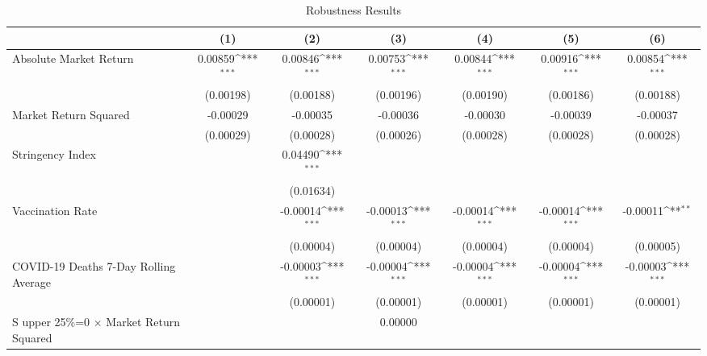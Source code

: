 \begin{table}[htbp]\centering
\def\sym#1{\ifmmode^{#1}\else\(^{#1}\)\fi}
\caption{Robustness Results \label{reg2}}
\begin{tabular}{l*{6}{c}}
\toprule
                    &\multicolumn{1}{c}{(1)}         &\multicolumn{1}{c}{(2)}         &\multicolumn{1}{c}{(3)}         &\multicolumn{1}{c}{(4)}         &\multicolumn{1}{c}{(5)}         &\multicolumn{1}{c}{(6)}         \\
\midrule
Absolute Market Return&     0.00859\sym{***}&     0.00846\sym{***}&     0.00753\sym{***}&     0.00844\sym{***}&     0.00916\sym{***}&     0.00854\sym{***}\\
                    &   (0.00198)         &   (0.00188)         &   (0.00196)         &   (0.00190)         &   (0.00186)         &   (0.00188)         \\
\addlinespace
Market Return Squared&    -0.00029         &    -0.00035         &    -0.00036         &    -0.00030         &    -0.00039         &    -0.00037         \\
                    &   (0.00029)         &   (0.00028)         &   (0.00026)         &   (0.00028)         &   (0.00028)         &   (0.00028)         \\
\addlinespace
Stringency Index    &                     &     0.04490\sym{***}&                     &                     &                     &                     \\
                    &                     &   (0.01634)         &                     &                     &                     &                     \\
\addlinespace
Vaccination Rate    &                     &    -0.00014\sym{***}&    -0.00013\sym{***}&    -0.00014\sym{***}&    -0.00014\sym{***}&    -0.00011\sym{**} \\
                    &                     &   (0.00004)         &   (0.00004)         &   (0.00004)         &   (0.00004)         &   (0.00005)         \\
\addlinespace
COVID-19 Deaths 7-Day Rolling Average&                     &    -0.00003\sym{***}&    -0.00004\sym{***}&    -0.00004\sym{***}&    -0.00004\sym{***}&    -0.00003\sym{***}\\
                    &                     &   (0.00001)         &   (0.00001)         &   (0.00001)         &   (0.00001)         &   (0.00001)         \\
\addlinespace
S upper 25\%=0 $\times$ Market Return Squared&                     &                     &     0.00000         &                     &                     &                     \\

\end{tabular}
\end{table}
